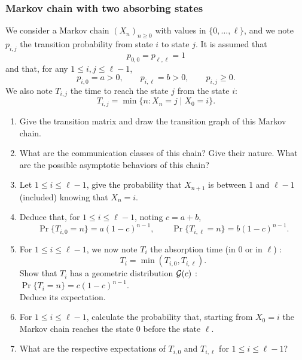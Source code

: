 \subsubsection{Markov chain with two absorbing states}

We consider a Markov chain $(X_n)_{n \geq 0}$ with values in $\{0, \dots, \ell\}$, and we note $p_{i, j}$ the transition probability from state $i$ to state $j$. It is assumed that 
$$
p_{0, 0} = p_{\ell, \ell} = 1 
$$
and that, for any $1 \leq i, j \leq \ell-1$, 
$$
p_{i, 0} = a > 0, \qquad p_{i, \ell} = b > 0, \qquad p_{i, j} \geq 0.
$$
We also note $T_{i, j}$ the time to reach the state $j$ from the state $i$:
$$
T_{i, j} = \min\{n: X_n = j \mid X_0 = i\}.
$$

\begin{enumerate}
  \item Give the transition matrix and draw the transition graph of this Markov chain.
  \item What are the communication classes of this chain? Give their nature. What are the possible asymptotic behaviors of this chain?
  \item Let $1 \leq i \leq \ell-1$, give the probability that $X_{n+1}$ is between 1 and $\ell-1$ (included) knowing that $X_n = i$.
  \item Deduce that, for $1 \leq i \leq \ell-1$, noting $c = a + b$, 
  $$
  \Pr\{T_{i, 0} = n\} = a (1 - c)^{n-1}, \qquad
  \Pr\{T_{i, \ell} = n\} = b (1 - c)^{n-1}.
  $$
  \item For $1 \leq i \leq \ell-1$, we now note $T_i$ the absorption time (in 0 or in $\ell$) : 
  $$
  T_i = \min(T_{i, 0}, T_{i, \ell}).
  $$
  Show that $T_i$ has a geometric distribution $\mathcal{G}(c)$ : $\Pr\{T_i = n\} = c (1 - c)^{n-1}$. \\
  Deduce its expectation.  
  \item For $1 \leq i \leq \ell-1$, calculate the probability that, starting from $X_0 = i$ the Markov chain reaches the state 0 before the state $\ell$.
  \item What are the respective expectations of $T_{i, 0}$ and $T_{i, \ell}$ for $1 \leq i \leq \ell-1$?
\end{enumerate}
